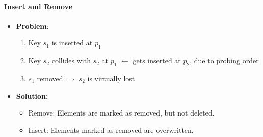 \documentclass[12pt, a4paper]{scrartcl}
\renewcommand{\implies}{\Rightarrow}
\begin{document}
\paragraph{Insert and Remove}
\begin{itemize}
\item \textbf{Problem}:
  \begin{enumerate}
  \item Key $s_1$ is inserted at $p_1$
  \item Key $s_2$ collides with $s_2$ at $p_1$ $\leftarrow$ gets inserted at $p_2$, due to probing order
  \item $s_1$ removed $\implies$ $s_2$ is virtually lost
  \end{enumerate}
\item \textbf{Solution:}
  \begin{itemize}
  \item Remove: Elements are marked as removed, but not deleted.
  \item Insert: Elements marked as removed are overwritten.
  \end{itemize}
\end{itemize}
\end{document}
